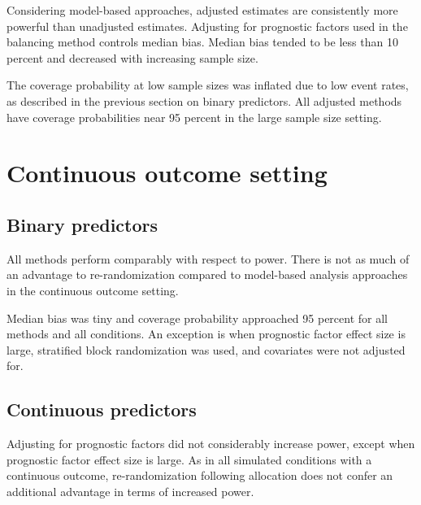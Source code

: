 Considering model-based approaches, adjusted estimates are consistently more powerful than unadjusted estimates. 
Adjusting for prognostic factors used in the balancing method controls median bias.
Median bias tended to be less than 10 percent and decreased with increasing sample size.

The coverage probability at low sample sizes was inflated due to low event rates, as described in the previous section on binary predictors.
All adjusted methods have coverage probabilities near 95 percent in the large sample size setting. 

\section{Continuous outcome setting}
\subsection{Binary predictors}
All methods perform comparably with respect to power. 
There is not as much of an advantage to re-randomization compared to model-based analysis approaches in the continuous outcome setting.

Median bias was tiny and coverage probability approached 95 percent for all methods and all conditions.
An exception is when prognostic factor effect size is large, stratified block randomization was used, and covariates were not adjusted for.

\subsection{Continuous predictors}
Adjusting for prognostic factors did not considerably increase power, except when prognostic factor effect size is large.
As in all simulated conditions with a continuous outcome, re-randomization following allocation does not confer an additional advantage in terms of increased power.
